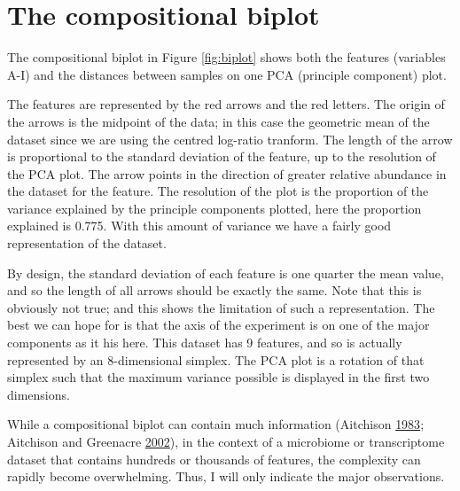 \documentclass[onecolumn]{book}
\theoremstyle{definition}
\theoremstyle{definition}
\theoremstyle{definition}
\theoremstyle{remark}
\begin{document}
\hypertarget{the-compositional-biplot}{%
\section{The compositional biplot}\label{the-compositional-biplot}}

The compositional biplot in Figure \ref{fig:biplot} shows both the
features (variables A-I) and the distances between samples on one PCA
(principle component) plot.

The features are represented by the red arrows and the red letters. The
origin of the arrows is the midpoint of the data; in this case the
geometric mean of the dataset since we are using the centred log-ratio
tranform. The length of the arrow is proportional to the standard
deviation of the feature, up to the resolution of the PCA plot. The
arrow points in the direction of greater relative abundance in the
dataset for the feature. The resolution of the plot is the proportion of
the variance explained by the principle components plotted, here the
proportion explained is 0.775. With this amount of variance we have a
fairly good representation of the dataset.

By design, the standard deviation of each feature is one quarter the
mean value, and so the length of all arrows should be exactly the same.
Note that this is obviously not true; and this shows the limitation of
such a representation. The best we can hope for is that the axis of the
experiment is on one of the major components as it his here. This
dataset has 9 features, and so is actually represented by an
8-dimensional simplex. The PCA plot is a rotation of that simplex such
that the maximum variance possible is displayed in the first two
dimensions.

While a compositional biplot can contain much information (Aitchison
\protect\hyperlink{ref-Ait1983}{1983}; Aitchison and Greenacre
\protect\hyperlink{ref-aitchison2002biplots}{2002}), in the context of a
microbiome or transcriptome dataset that contains hundreds or thousands
of features, the complexity can rapidly become overwhelming. Thus, I
will only indicate the major observations.
\end{document}
